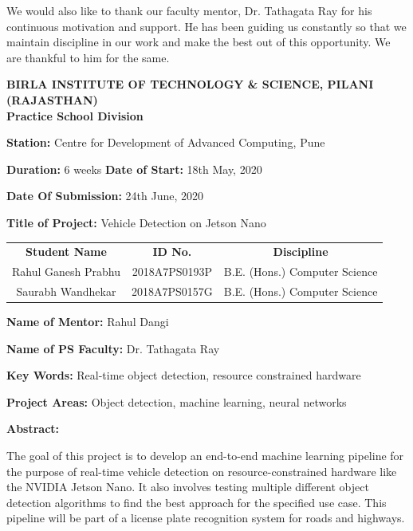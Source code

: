 \documentclass[12pt,letterpaper]{article}
\begin{document}
We would also like to thank our faculty mentor, Dr. Tathagata Ray for his continuous motivation and support. He has been guiding us constantly so that we maintain discipline in our work and make the best out of this opportunity. We are thankful to him for the same.

\pagebreak



\thispagestyle{empty}

\begin{center}
    {\large 
    \textbf{BIRLA INSTITUTE OF TECHNOLOGY \& SCIENCE, PILANI} \\
     \textbf{(RAJASTHAN)} \\
     \textbf{Practice School Division}
}
\end{center}

\noindent \textbf{Station:} Centre for Development of Advanced Computing, Pune

\noindent \textbf{Duration:} 6 weeks \hfill \textbf{Date of Start:} 18th May, 2020

 \noindent \textbf{Date Of Submission:} 24th June, 2020

 \noindent \textbf{Title of Project:} Vehicle Detection on Jetson Nano

\medskip

\begin{tabular}{c c c}
\textbf{Student Name} & \textbf{ID No.} & \textbf{Discipline} \\
Rahul Ganesh Prabhu & 2018A7PS0193P & B.E. (Hons.) Computer Science \\
Saurabh Wandhekar & 2018A7PS0157G & B.E. (Hons.) Computer Science
\end{tabular}

\medskip

 \noindent \textbf{Name of Mentor:} Rahul Dangi

 \noindent \textbf{Name of PS Faculty:} Dr. Tathagata Ray

 \noindent \textbf{Key Words:} Real-time object detection, resource constrained hardware

 \noindent \textbf{Project Areas:} Object detection, machine learning, neural networks

 \noindent \textbf{Abstract:}

\noindent The goal of this project is to develop an end-to-end machine learning pipeline for the purpose of real-time vehicle detection on resource-constrained hardware like the NVIDIA Jetson Nano. It also involves testing multiple different object detection algorithms to find the best approach for the specified use case. This pipeline will be part of a license plate recognition system for roads and highways.
\end{document}

